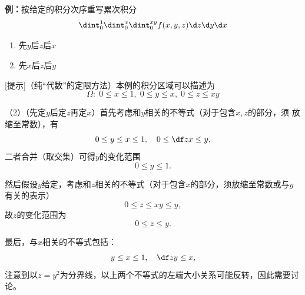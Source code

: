 {\bf 例：}按给定的积分次序重写累次积分
$$\dint_0^1\dint_0^x\dint_0^{xy}f(x,y,z)\d z\d y\d x$$
\begin{enumerate}[(1)]
  \setlength{\itemindent}{1cm}
  \item 先$y$后$z$后$x$
  \item 先$x$后$z$后$y$
\end{enumerate}

\begin{center}
\end{center}

[提示]（纯“代数”的定限方法）本例的积分区域可以描述为
$$\Omega:\;0\leq x\leq1,\;0\leq y\leq x,\;0\leq z\leq xy$$

（2）（先定$y$后定$z$再定$x$）首先考虑和$y$相关的不等式（对于包含$x,z$的部分，须
放缩至常数），有
$$0\leq y\leq x\leq 1,\quad 0\leq \df zx\leq y,$$
二者合并（取交集）可得$y$的变化范围
$$0\leq y\leq 1.$$

然后假设$y$给定，考虑和$z$相关的不等式（对于包含$x$的部分，须放缩至常数或与$y$有关的表示）
$$0\leq z\leq xy\leq y,$$
故$z$的变化范围为
$$0\leq z\leq y.$$

最后，与$x$相关的不等式包括：
$$y\leq x\leq 1,\quad \df zy\leq x,$$
注意到以$z=y^2$为分界线，以上两个不等式的左端大小关系可能反转，因此需要讨论。

